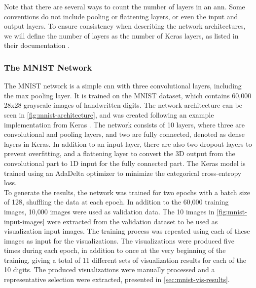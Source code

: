 \noindent Note that there are several ways to count the number of layers in an \acrshort{ann}. Some conventions do not include pooling or flattening layers, or even the input and output layers. To ensure consistency when describing the network architectures, we will define the number of layers as the number of Keras layers, as listed in their documentation \cite{keras-documentation}.

\subsubsection{The MNIST Network}

The MNIST network is a simple \acrshort{cnn} with three convolutional layers, including the max pooling layer. It is trained on the MNIST dataset, which contains 60,000 28x28 grayscale images of handwritten digits. The network architecture can be seen in \autoref{fig:mnist-architecture}, and was created following an example implementation from Keras \cite{keras-mnist}. The network consists of 10 layers, where three are convolutional and pooling layers, and two are fully connected, denoted as dense layers in Keras. In addition to an input layer, there are also two dropout layers to prevent overfitting, and a flattening layer to convert the 3D output from the convolutional part to 1D input for the fully connected part. The Keras model is trained using an AdaDelta optimizer to minimize the categorical cross-entropy loss. \\

\noindent To generate the results, the network was trained for two epochs with a batch size of 128, shuffling the data at each epoch. In addition to the 60,000 training images, 10,000 images were used as validation data. The 10 images in \autoref{fig:mnist-input-images} were extracted from the validation dataset to be used as visualization input images. The training process was repeated using each of these images as input for the visualizations. The visualizations were produced five times during each epoch, in addition to once at the very beginning of the training, giving a total of 11 different sets of visualization results for each of the 10 digits. The produced visualizations were manually processed and a representative selection were extracted, presented in \autoref{sec:mnist-vis-results}.


